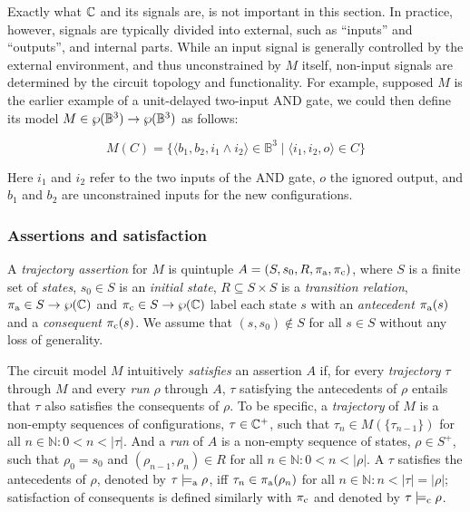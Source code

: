 
Exactly what $\mathbb{C}$ and its signals are, is not important in this section. In practice, however, signals are typically divided into external, such as ``inputs'' and ``outputs'', and internal parts. While an input signal is generally controlled by the external environment, and thus unconstrained by $M$ itself, non-input signals are determined by the circuit topology and functionality. For example, supposed $M$ is the earlier example of a unit-delayed two-input AND gate, we could then define its model $M \in \wp(\mathbb{B}^{3}) \rightarrow \wp(\mathbb{B}^{3})$ as follows:


\begin{equation*}
M(C) = \{ \langle b_{1}, b_{2}, i_{1} \wedge i_{2} \rangle \in \mathbb{B}^{3} \mid \langle i_{1}, i_{2}, o \rangle \in C \}
\end{equation*}

\noindent Here $i_{1}$ and $i_{2}$ refer to the two inputs of the AND gate, $o$ the ignored output, and $b_{1}$ and $b_{2}$ are unconstrained inputs for the new configurations.

\subsubsection{Assertions and satisfaction} \label{sec:set-ste-sat}

A \textit{trajectory assertion} for $M$ is quintuple $A = (S, s_{0}, R, \operatorname{\pi_{\textrm{a}}}, \operatorname{\pi_{\textrm{c}}})$, where $S$ is a finite set of \textit{states}, $s_{0} \in S$ is an \textit{initial state}, $R \subseteq S \times S$ is a \textit{transition relation}, $\operatorname{\pi_{\textrm{a}}} \in S \rightarrow \wp(\mathbb{C})$ and $\operatorname{\pi_{\textrm{c}}} \in S \rightarrow \wp(\mathbb{C})$ label each state $s$ with an \textit{antecedent} $\operatorname{\pi_{\textrm{a}}}(s)$ and a \textit{consequent} $\operatorname{\pi_{\textrm{c}}}(s)$. We assume that $(s,s_{0}) \notin S$ for all $s \in S$ without any loss of generality.

The circuit model $M$ intuitively \textit{satisfies} an assertion $A$ if, for every \textit{trajectory} $\tau$ through $M$ and every \textit{run} $\rho$ through $A$, $\tau$ satisfying the antecedents of $\rho$ entails that $\tau$ also satisfies the consequents of $\rho$. To be specific, a \textit{trajectory} of $M$ is a non-empty sequences of configurations, $\tau \in \mathbb{C}^{+}$, such that $\tau_{n} \in M(\{ \tau_{n-1} \})$ for all $n \in \mathbb{N} : 0 < n < | \tau |$. And a \textit{run} of $A$ is a non-empty sequence of states, $\rho \in S^{+}$, such that $\rho_{0} = s_{0}$ and $(\rho_{n-1}, \rho_{n}) \in R$ for all $n \in \mathbb{N} : 0 < n < | \rho |$. A $\tau$ satisfies the antecedents of $\rho$, denoted by $\tau \models_{\textrm{a}} \rho$, iff $\tau_{n} \in \operatorname{\pi_{\textrm{a}}}(\rho_{n})$ for all $n \in \mathbb{N} : n < | \tau | = | \rho |$; satisfaction of consequents is defined similarly with $\operatorname{\pi_{\textrm{c}}}$ and denoted by $\tau \models_{\textrm{c}} \rho$.


